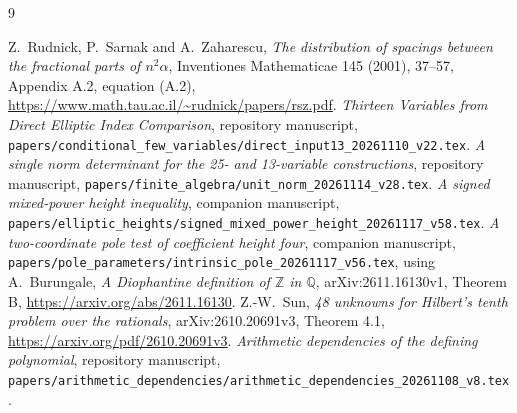 \documentclass[11pt,a4paper]{article}
\newcommand{\Q}{\mathbb Q}\newcommand{\Z}{\mathbb Z}
\begin{document}
\begin{thebibliography}{9}\raggedright
{}Z.~Rudnick, P.~Sarnak and A.~Zaharescu,
\emph{The distribution of spacings between the fractional parts of
$n^2\alpha$}, Inventiones Mathematicae 145 (2001), 37--57,
Appendix A.2, equation (A.2),
\url{https://www.math.tau.ac.il/~rudnick/papers/rsz.pdf}.
\emph{Thirteen Variables from Direct Elliptic
Index Comparison}, repository manuscript,
\nolinkurl{papers/conditional_few_variables/direct_input13_20261110_v22.tex}.
\emph{A single norm determinant for the 25- and 13-variable
constructions}, repository manuscript,
\nolinkurl{papers/finite_algebra/unit_norm_20261114_v28.tex}.
\emph{A signed mixed-power height inequality},
companion manuscript,
\nolinkurl{papers/elliptic_heights/signed_mixed_power_height_20261117_v58.tex}.
\emph{A two-coordinate pole test of coefficient
height four}, companion manuscript,
\nolinkurl{papers/pole_parameters/intrinsic_pole_20261117_v56.tex},
using A.~Burungale,
\emph{A Diophantine definition of $\Z$ in $\Q$},
arXiv:2611.16130v1, Theorem B,
\url{https://arxiv.org/abs/2611.16130}.
Z.-W.~Sun,
\emph{48 unknowns for Hilbert's tenth problem over the rationals},
arXiv:2610.20691v3, Theorem 4.1,
\url{https://arxiv.org/pdf/2610.20691v3}.
\emph{Arithmetic dependencies of the defining
polynomial}, repository manuscript,
\nolinkurl{papers/arithmetic_dependencies/arithmetic_dependencies_20261108_v8.tex}.
\end{thebibliography}
\end{document}
